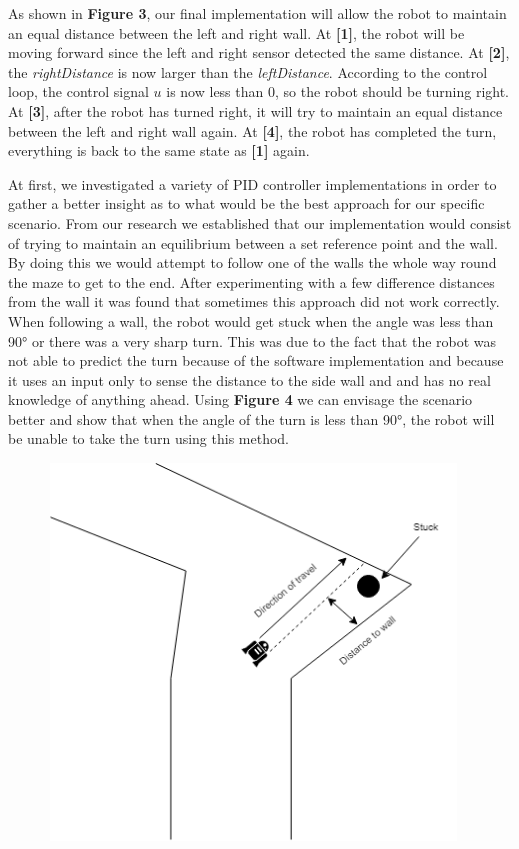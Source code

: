 \documentclass[hidelinks,a4paper,11pt]{article}
\begin{document}
\begin{mdframed}
As shown in \textbf{Figure 3}, our final implementation will allow the robot to maintain an equal
distance between the left and right wall. At \textbf{[1]}, the robot will be moving forward since
the left and right sensor detected the same distance. At \textbf{[2]}, the \emph{rightDistance} is
now larger than the \emph{leftDistance}. According to the control loop, the control signal $u$ is
now less than 0, so the robot should be turning right. At \textbf{[3]}, after the robot has turned
right, it will try to maintain an equal distance between the left and right wall again. At
\textbf{[4]}, the robot has completed the turn, everything is back to the same state as \textbf{[1]}
again.

At first, we investigated a variety of PID controller implementations in order to gather a better
insight as to what would be the best approach for our specific scenario. From our research we
established that our implementation would consist of trying to maintain an equilibrium between a set
reference point and the wall. By doing this we would attempt to follow one of the walls the whole
way round the maze to get to the end. After experimenting with a few difference distances from the
wall it was found that sometimes this approach did not work correctly. When following a wall, the
robot would get stuck when the angle was less than \ang{90} or there was a very sharp turn. This was
due to the fact that the robot was not able to predict the turn because of the software
implementation and because it uses an input only to sense the distance to the side wall and and has
no real knowledge of anything ahead. Using \textbf{Figure 4} we can envisage the scenario better and
show that when the angle of the turn is less than \ang{90}, the robot will be unable to take the
turn using this method.
\vspace*{\baselineskip}
\begin{center}
\includegraphics[width=13cm, height=10cm]{OneWall.png}

\end{center}
\end{mdframed}
\end{document}
